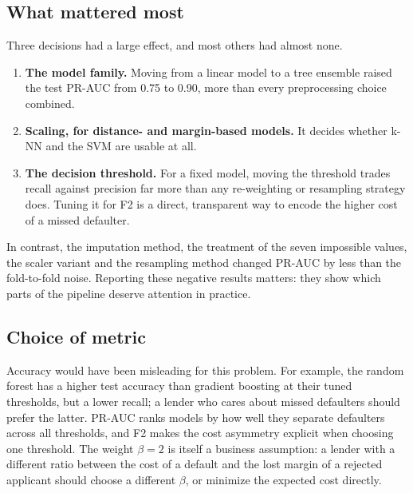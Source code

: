 \subsection{What mattered most}
Three decisions had a large effect, and most others had almost none.
\begin{enumerate}
  \item \textbf{The model family.} Moving from a linear model to a tree ensemble raised the test PR-AUC from 0.75 to 0.90, more than every preprocessing choice combined.
  \item \textbf{Scaling, for distance- and margin-based models.} It decides whether k-NN and the SVM are usable at all.
  \item \textbf{The decision threshold.} For a fixed model, moving the threshold trades recall against precision far more than any re-weighting or resampling strategy does. Tuning it for F2 is a direct, transparent way to encode the higher cost of a missed defaulter.
\end{enumerate}
In contrast, the imputation method, the treatment of the seven impossible values, the scaler variant and the resampling method changed PR-AUC by less than the fold-to-fold noise.
Reporting these negative results matters: they show which parts of the pipeline deserve attention in practice.

\subsection{Choice of metric}
Accuracy would have been misleading for this problem.
For example, the random forest has a higher test accuracy than gradient boosting at their tuned thresholds, but a lower recall; a lender who cares about missed defaulters should prefer the latter.
PR-AUC ranks models by how well they separate defaulters across all thresholds, and F2 makes the cost asymmetry explicit when choosing one threshold.
The weight $\beta = 2$ is itself a business assumption: a lender with a different ratio between the cost of a default and the lost margin of a rejected applicant should choose a different $\beta$, or minimize the expected cost directly.

